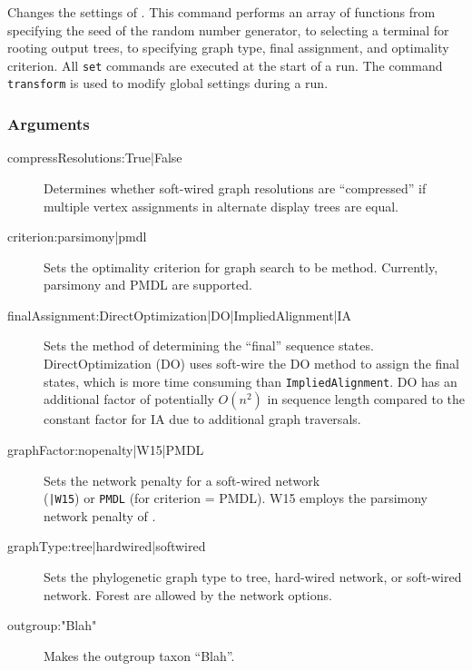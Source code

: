 	\begin{phygdescription}
		{Changes the settings of \phyg. This command performs an array of functions
		from specifying the seed of the random number generator, to selecting a terminal for
		rooting output trees, to specifying  graph type, final assignment, and 
		optimality criterion. All \texttt{set} commands are executed at the start of a run. 
		The command \texttt{transform} is used to modify global settings during a run.}
	\end{phygdescription}
			
	\subsubsection{Arguments}
		\begin{description}
			\item[compressResolutions:True|False] Determines whether soft-wired graph 
			resolutions are ``compressed'' if multiple vertex assignments in alternate display 
			trees are equal.
			
			\item[criterion:parsimony|pmdl] Sets the optimality criterion for graph search to be 
			method. Currently, parsimony and PMDL \citep{WheelerandVaron2022} are supported.
			
			\item[finalAssignment:DirectOptimization|DO|ImpliedAlignment|IA] Sets the method 
			of determining the ``final'' sequence states. DirectOptimization (DO) uses soft-wire the DO 
			method to assign the final states, which is more time consuming than \texttt{ImpliedAlignment}. 
			DO has an additional factor of potentially $O(n^2)$ in sequence length compared 
			to the constant factor for IA due to additional graph traversals.
			
			\item[graphFactor:nopenalty|W15|PMDL] Sets the network penalty for a soft-wired network\\ 
			(\texttt{|W15}) or \texttt{PMDL} (for criterion = PMDL). W15 employs the
			parsimony network penalty of \cite{Wheeler2015}.
			
			\item[graphType:tree|hardwired|softwired] Sets the phylogenetic graph type to tree, 
			hard-wired network, or soft-wired network. Forest are allowed by the network options.
			
			\item[outgroup:"Blah"] Makes the outgroup taxon ``Blah''. 
			

\end{description}
